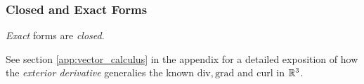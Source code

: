 \subsubsection{Closed and Exact Forms}


\begin{lemma}
    \emph{Exact} forms are \emph{closed}.
\end{lemma}
See section \ref{app:vector_calculus} in the appendix for a detailed exposition of how the \emph{exterior derivative} generalies the known $\mathrm{div},\mathrm{grad}$ and $\mathrm{curl}$ in $\mathbb{R}^3$.

